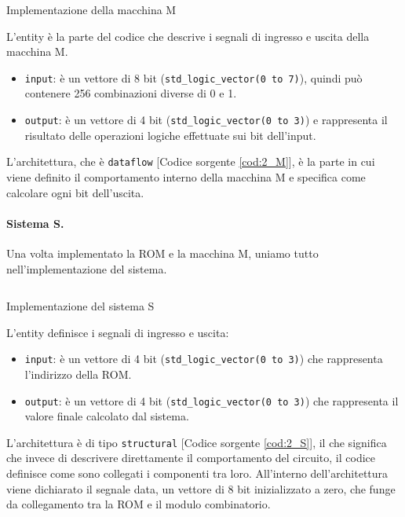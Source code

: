 \begin{code}
    \inputminted{vhdl}{vhdl/2_M.vhd}
    \caption{Implementazione della macchina M}
    \label{cod:2_M}
\end{code}

L'entity è la parte del codice che descrive i segnali di ingresso e uscita della macchina M.

\begin{itemize}
    \item \texttt{input}: è un vettore di 8 bit (\texttt{std\_logic\_vector(0 to 7)}), quindi può contenere 256 combinazioni diverse di 0 e 1.
    \item \texttt{output}: è un vettore di 4 bit (\texttt{std\_logic\_vector(0 to 3)}) e rappresenta il risultato delle operazioni logiche effettuate sui bit dell'input.
\end{itemize}

L’architettura, che è \texttt{dataflow} [Codice sorgente \ref{cod:2_M}], è la parte in cui viene definito il comportamento interno della macchina M e specifica come calcolare ogni bit dell'uscita.

\paragraph{Sistema S.} Una volta implementato la ROM e la macchina M, uniamo tutto nell’implementazione del sistema.

\begin{code}
    \inputminted{vhdl}{vhdl/2_S.vhd}
    \caption{Implementazione del sistema S}
    \label{cod:2_S}
\end{code}

L'entity definisce i segnali di ingresso e uscita:

\begin{itemize}
    \item \texttt{input}: è un vettore di 4 bit (\texttt{std\_logic\_vector(0 to 3)}) che rappresenta l'indirizzo della ROM.
    \item \texttt{output}: è un vettore di 4 bit (\texttt{std\_logic\_vector(0 to 3)}) che rappresenta il valore finale calcolato dal sistema.
\end{itemize}

L'architettura è di tipo \texttt{structural} [Codice sorgente \ref{cod:2_S}], il che significa che invece di descrivere direttamente il comportamento del circuito, il codice definisce come sono collegati i componenti tra loro. All'interno dell'architettura viene dichiarato il segnale data, un vettore di 8 bit inizializzato a zero, che funge da collegamento tra la ROM e il modulo combinatorio.

